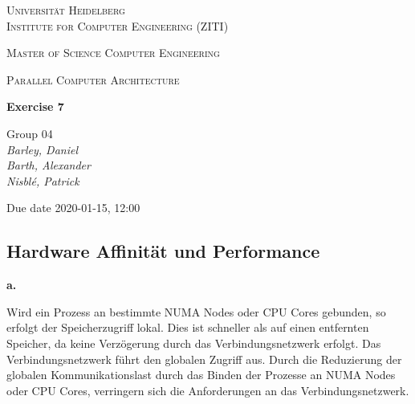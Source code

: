 \documentclass[12pt]{article}
\newcommand{\lecture}{Parallel Computer Architecture}
\newcommand{\exercise}{Exercise 7}
\newcommand{\groupnumber}{Group 04}
\newcommand{\groupmemberslist}{Barley, Daniel\\Barth, Alexander\\Nisblé, Patrick}
\newcommand{\duedate}{2020-01-15, 12:00}
\begin{document}
	\begin{titlepage}
		\centering
		
		{\scshape\LARGE Universität Heidelberg\\Institute for Computer Engineering (ZITI) \par}
		\vspace{1.5cm}
		{\scshape\Large Master of Science Computer Engineering \par}
		\vspace{0.5cm}
		{\scshape\Large \lecture \par}
		\vspace{1.5cm}
		{\huge\bfseries \exercise \par}
		\vspace{2cm}
		{\Large \groupnumber \itshape  \\ \groupmemberslist \par}
		\vfill
		
		
		{\large Due date \duedate \par}
	\end{titlepage}

\setcounter{section}{7}




\setcounter{subsection}{2}
\subsection{Hardware Affinität und Performance}

\noindent \textbf{a.}

Wird ein Prozess an bestimmte NUMA Nodes oder CPU Cores gebunden, so erfolgt der Speicherzugriff lokal.
Dies ist schneller als auf einen entfernten Speicher, da keine Verzögerung durch das Verbindungsnetzwerk erfolgt.
Das Verbindungsnetzwerk führt den globalen Zugriff aus.
Durch die Reduzierung der globalen Kommunikationslast durch das Binden der Prozesse an NUMA Nodes oder CPU Cores, verringern sich die Anforderungen an das Verbindungsnetzwerk. 


\end{document}
